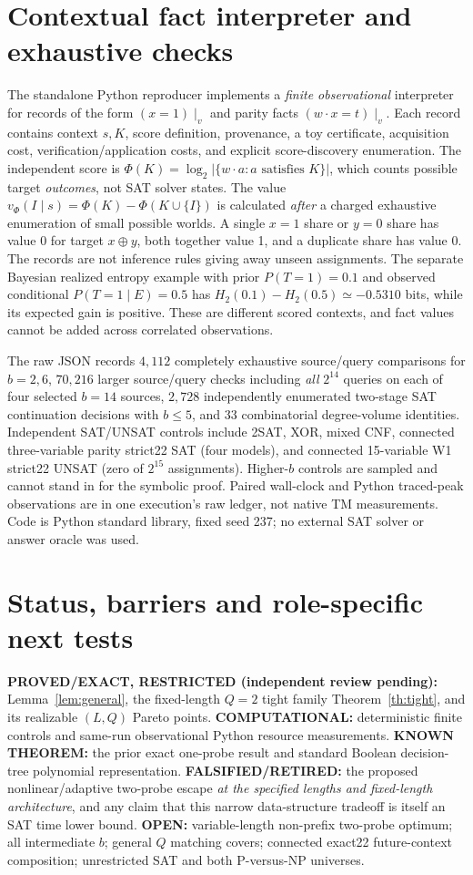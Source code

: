 \documentclass[10pt]{article}
\begin{document}
\section{Contextual fact interpreter and exhaustive checks}
The standalone Python reproducer implements a \emph{finite observational} interpreter for records of the form $(x=1)\mid_v$ and parity facts $(w\cdot x=t)\mid_v$. Each record contains context $s,K$, score definition, provenance, a toy certificate, acquisition cost, verification/application costs, and explicit score-discovery enumeration. The independent score is $\Phi(K)=\log_2|\{w\cdot a:a\text{ satisfies }K\}|$, which counts possible target \emph{outcomes}, not SAT solver states. The value $v_\Phi(I\mid s)=\Phi(K)-\Phi(K\cup\{I\})$ is calculated \emph{after} a charged exhaustive enumeration of small possible worlds. A single $x=1$ share or $y=0$ share has value 0 for target $x\oplus y$, both together value 1, and a duplicate share has value 0. The records are not inference rules giving away unseen assignments. The separate Bayesian realized entropy example with prior $P(T=1)=0.1$ and observed conditional $P(T=1\mid E)=0.5$ has $H_2(0.1)-H_2(0.5)\simeq-0.5310$ bits, while its expected gain is positive. These are different scored contexts, and fact values cannot be added across correlated observations.

The raw JSON records $4,112$ completely exhaustive source/query comparisons for $b=2,6$, $70,216$ larger source/query checks including \emph{all} $2^{14}$ queries on each of four selected $b=14$ sources, $2,728$ independently enumerated two-stage SAT continuation decisions with $b\le5$, and $33$ combinatorial degree-volume identities. Independent SAT/UNSAT controls include 2SAT, XOR, mixed CNF, connected three-variable parity strict22 SAT (four models), and connected 15-variable W1 strict22 UNSAT (zero of $2^{15}$ assignments). Higher-$b$ controls are sampled and cannot stand in for the symbolic proof. Paired wall-clock and Python traced-peak observations are in one execution's raw ledger, not native TM measurements. Code is Python standard library, fixed seed 237; no external SAT solver or answer oracle was used.

\section{Status, barriers and role-specific next tests}
\noindent\textbf{PROVED/EXACT, RESTRICTED (independent review pending):} Lemma~\ref{lem:general}, the fixed-length $Q=2$ tight family Theorem~\ref{th:tight}, and its realizable $(L,Q)$ Pareto points. \textbf{COMPUTATIONAL:} deterministic finite controls and same-run observational Python resource measurements. \textbf{KNOWN THEOREM:} the prior exact one-probe result and standard Boolean decision-tree polynomial representation. \textbf{FALSIFIED/RETIRED:} the proposed nonlinear/adaptive two-probe escape \emph{at the specified lengths and fixed-length architecture}, and any claim that this narrow data-structure tradeoff is itself an SAT time lower bound. \textbf{OPEN:} variable-length non-prefix two-probe optimum; all intermediate $b$; general $Q$ matching covers; connected exact22 future-context composition; unrestricted SAT and both P-versus-NP universes.
\end{document}
